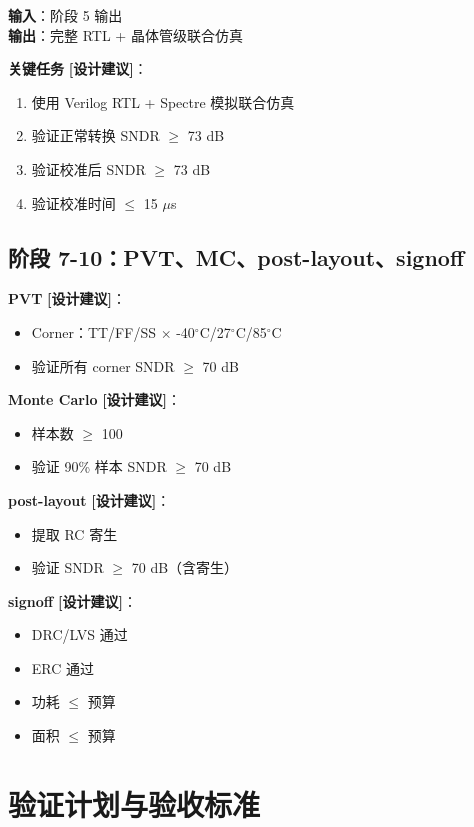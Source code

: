 \documentclass[UTF8,a4paper,11pt]{ctexart}
\newcommand{\suggested}{\textcolor{suggestblue}{\textbf{[设计建议]}}}
\providecommand{\textmu}{\ensuremath{\mu}}
\begin{document}
\textbf{输入}：阶段 5 输出\\
\textbf{输出}：完整 RTL + 晶体管级联合仿真

\textbf{关键任务} \suggested：
\begin{enumerate}[leftmargin=2em]
\item 使用 Verilog RTL + Spectre 模拟联合仿真
\item 验证正常转换 SNDR $\geq$ 73 dB
\item 验证校准后 SNDR $\geq$ 73 dB
\item 验证校准时间 $\leq$ 15 \textmu s
\end{enumerate}

\subsection{阶段 7-10：PVT、MC、post-layout、signoff}

\textbf{PVT} \suggested：
\begin{itemize}[leftmargin=2em]
\item Corner：TT/FF/SS $\times$ -40$^\circ$C/27$^\circ$C/85$^\circ$C
\item 验证所有 corner SNDR $\geq$ 70 dB
\end{itemize}

\textbf{Monte Carlo} \suggested：
\begin{itemize}[leftmargin=2em]
\item 样本数 $\geq$ 100
\item 验证 90\% 样本 SNDR $\geq$ 70 dB
\end{itemize}

\textbf{post-layout} \suggested：
\begin{itemize}[leftmargin=2em]
\item 提取 RC 寄生
\item 验证 SNDR $\geq$ 70 dB（含寄生）
\end{itemize}

\textbf{signoff} \suggested：
\begin{itemize}[leftmargin=2em]
\item DRC/LVS 通过
\item ERC 通过
\item 功耗 $\leq$ 预算
\item 面积 $\leq$ 预算
\end{itemize}

\section{验证计划与验收标准}
\end{document}
